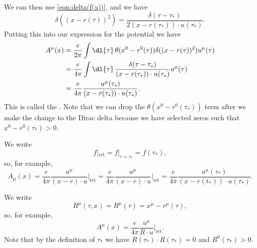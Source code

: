 \documentclass[fleqn]{NotesClass}
\newcommand*{\ret}{{\text{ret}}}
\begin{document}
    We can then use \cref{eqn:delta(f(x))}, and we have
    \begin{equation}
        \delta((x - r(\tau))^2) = \frac{\delta(\tau - \tau_*)}{2(x - r(\tau_*)) \cdot u(\tau_*)}.
    \end{equation}
    Putting this into our expression for the potential we have
    \begin{align}
        A^\mu(x) &= \frac{e}{2\pi} \int \dl{\tau} \, \theta(x^0 - r^0(\tau)) \delta((x - r(\tau))^2) u^\mu(\tau)\\
        &= \frac{e}{4\pi} \int \dl{\tau} \, \frac{\delta(\tau - \tau_*)}{(x - r(\tau_*)) \cdot u(\tau_*)} u^\mu(\tau)\\
        &= \frac{e}{4\pi} \frac{u^\mu(\tau_*)}{(x - r(\tau_*)) \cdot u(\tau_*)}.
    \end{align}
    This is called the .
    Note that we can drop the \(\theta(x^0 - r^0(\tau_*))\) term after we make the change to the Dirac delta because we have selected zeros such that \(x^0 - r^0(\tau_*) > 0\).
    
    \begin{ntn}{}{}
        We write
        \begin{equation}
            f|_{\ret} = f|_{\tau = \tau_*} = f(\tau_*),
        \end{equation}
        so, for example,
        \begin{equation*}
            A_\mu(x) = \frac{e}{4\pi} \frac{u^\mu}{(x - r) \cdot u} \bigg|_{\ret} = \frac{e}{4\pi} \frac{u^\mu}{(x - r)\cdot u} \bigg|_{\ret} = \frac{e}{4\pi} \frac{u^\mu(\tau_*)}{(x - r(t_*))\cdot u(\tau_*)}.
        \end{equation*}
        
        We write
        \begin{equation}
            R^\mu(\tau, x) = R^\mu(\tau) = x^\mu - r^\mu(\tau),
        \end{equation}
        so, for example,
        \begin{equation}
            A^\mu(x) = \frac{e}{4\pi} \frac{u^\mu}{R \cdot u} \bigg|_{\ret}.
        \end{equation}
        Note that by the definition of \(\tau_*\) we have \(R(\tau_*) \cdot R(\tau_*) = 0\) and \(R^0(\tau_*) > 0\).
    \end{ntn}
    
\end{document}
